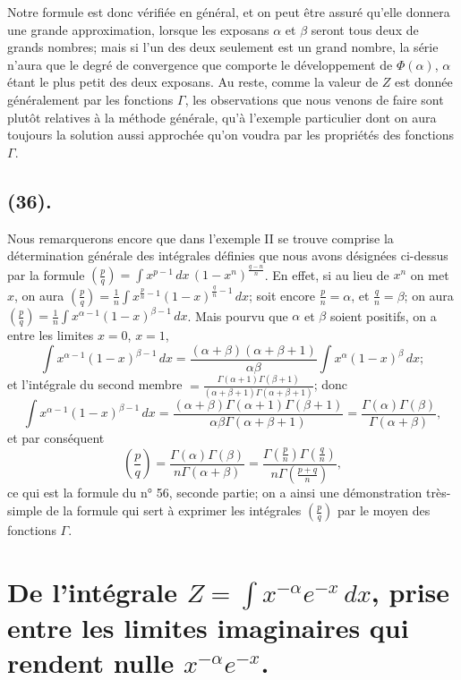\documentclass{article}
\begin{document}

Notre formule est donc vérifiée en général, et on peut être assuré qu'elle donnera une grande approximation, lorsque les exposans $\alpha$ et $\beta$ seront tous deux de grands nombres; mais si l'un des deux seulement est un grand nombre, la série n'aura que le degré de convergence que comporte le développement de $\Phi(\alpha)$, $\alpha$ étant le plus petit des deux exposans. Au reste, comme la valeur de $Z$ est donnée généralement par les fonctions $\Gamma$, les observations que nous venons de faire sont plutôt relatives à la méthode générale, qu'à l'exemple particulier dont on aura toujours la solution aussi approchée qu'on voudra par les propriétés des fonctions $\Gamma$.

\subsection*{(36).}

Nous remarquerons encore que dans l'exemple II se trouve comprise la détermination générale des intégrales définies que nous avons désignées ci-dessus par la formule $\left(\frac{p}{q}\right)=\displaystyle\int x^{p-1}\,dx\,(1-x^{n})^{\frac{q-n}{n}}$. En effet, si au lieu de $x^{n}$ on met $x$, on aura $\left(\frac{p}{q}\right)=\frac{1}{n}\displaystyle\int x^{\frac{p}{n}-1}(1-x)^{\frac{q}{n}-1}\,dx$; soit encore $\frac{p}{n}=\alpha$, et $\frac{q}{n}=\beta$; on aura $\left(\frac{p}{q}\right)=\frac{1}{n}\displaystyle\int x^{\alpha-1}(1-x)^{\beta-1}\,dx$. Mais pourvu que $\alpha$ et $\beta$ soient positifs, on a entre les limites $x=0$, $x=1$,
\[ \int x^{\alpha-1}(1-x)^{\beta-1}\,dx=\frac{(\alpha+\beta)(\alpha+\beta+1)}{\alpha\beta}\int x^{\alpha}(1-x)^{\beta}\,dx; \]
et l'intégrale du second membre $=\frac{\Gamma(\alpha+1)\Gamma(\beta+1)}{(\alpha+\beta+1)\Gamma(\alpha+\beta+1)}$; donc
\[ \int x^{\alpha-1}(1-x)^{\beta-1}\,dx=\frac{(\alpha+\beta)\Gamma(\alpha+1)\Gamma(\beta+1)}{\alpha\beta\Gamma(\alpha+\beta+1)}=\frac{\Gamma(\alpha)\Gamma(\beta)}{\Gamma(\alpha+\beta)}, \]
et par conséquent
\[ \left(\frac{p}{q}\right)=\frac{\Gamma(\alpha)\Gamma(\beta)}{n\Gamma(\alpha+\beta)}=\frac{\Gamma\left(\frac{p}{n}\right)\Gamma\left(\frac{q}{n}\right)}{n\Gamma\left(\frac{p+q}{n}\right)}, \]
ce qui est la formule du n° 56, seconde partie; on a ainsi une démonstration très-simple de la formule qui sert à exprimer les intégrales $\left(\frac{p}{q}\right)$ par le moyen des fonctions $\Gamma$.


\section*{De l'intégrale $Z=\displaystyle\int x^{-\alpha}e^{-x}\,dx$, prise entre les limites imaginaires qui rendent nulle $x^{-\alpha}e^{-x}$.}
\end{document}
